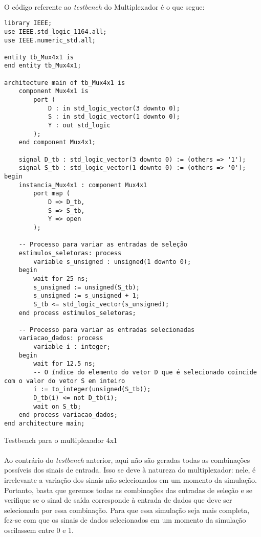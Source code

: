 \documentclass[a4paper,12pt]{article}
\newenvironment{code}{\captionsetup{type=listing}}{}
\begin{document}
\paragraph{}
O código referente ao \textit{testbench} do Multiplexador é o que segue:

\begin{code}
\begin{verbatim}
library IEEE;
use IEEE.std_logic_1164.all;
use IEEE.numeric_std.all;

entity tb_Mux4x1 is
end entity tb_Mux4x1;

architecture main of tb_Mux4x1 is
    component Mux4x1 is
        port (
            D : in std_logic_vector(3 downto 0);
            S : in std_logic_vector(1 downto 0);
            Y : out std_logic
        );
    end component Mux4x1;
    
    signal D_tb : std_logic_vector(3 downto 0) := (others => '1');
    signal S_tb : std_logic_vector(1 downto 0) := (others => '0');
begin
    instancia_Mux4x1 : component Mux4x1
        port map (
            D => D_tb,
            S => S_tb,
            Y => open
        );

    -- Processo para variar as entradas de seleção
    estimulos_seletoras: process
        variable s_unsigned : unsigned(1 downto 0);
    begin
        wait for 25 ns;
        s_unsigned := unsigned(S_tb);
        s_unsigned := s_unsigned + 1;
        S_tb <= std_logic_vector(s_unsigned);
    end process estimulos_seletoras;
    
    -- Processo para variar as entradas selecionadas
    variacao_dados: process
        variable i : integer;
    begin
        wait for 12.5 ns;
        -- O índice do elemento do vetor D que é selecionado coincide com o valor do vetor S em inteiro
        i := to_integer(unsigned(S_tb));
        D_tb(i) <= not D_tb(i);
        wait on S_tb;
    end process variacao_dados;
end architecture main;
\end{verbatim}
\caption{Testbench para o multiplexador 4x1}
\end{code}

\paragraph{}
Ao contrário do \textit{testbench} anterior, aqui não são geradas todas as combinações possíveis dos sinais de entrada. Isso se deve à natureza do multiplexador: nele, é irrelevante a variação dos sinais não selecionados em um momento da simulação. Portanto, basta que geremos todas as combinações das entradas de seleção e se verifique se o sinal de saída corresponde à entrada de dados que deve ser selecionada por essa combinação. Para que essa simulação seja mais completa, fez-se com que os sinais de dados selecionados em um momento da simulação oscilassem entre 0 e 1.
\end{document}
